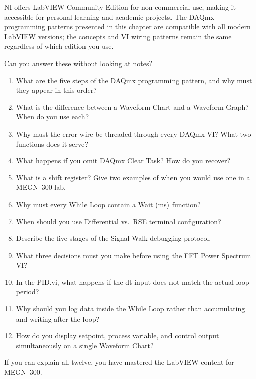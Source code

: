 \begin{tipbox}
NI offers LabVIEW Community Edition for non-commercial use, making it accessible for personal learning and academic projects. The DAQmx programming patterns presented in this chapter are compatible with all modern LabVIEW versions; the concepts and VI wiring patterns remain the same regardless of which edition you use.
\end{tipbox}

\begin{masterycheckbox}
Can you answer these without looking at notes?
\begin{enumerate}[leftmargin=1.5em]
\item What are the five steps of the DAQmx programming pattern, and why must they appear in this order?
\item What is the difference between a Waveform Chart and a Waveform Graph? When do you use each?
\item Why must the error wire be threaded through every DAQmx VI? What two functions does it serve?
\item What happens if you omit DAQmx Clear Task? How do you recover?
\item What is a shift register? Give two examples of when you would use one in a MEGN~300 lab.
\item Why must every While Loop contain a Wait (ms) function?
\item When should you use Differential vs.\ RSE terminal configuration?
\item Describe the five stages of the Signal Walk debugging protocol.
\item What three decisions must you make before using the FFT Power Spectrum VI?
\item In the PID.vi, what happens if the dt input does not match the actual loop period?
\item Why should you log data inside the While Loop rather than accumulating and writing after the loop?
\item How do you display setpoint, process variable, and control output simultaneously on a single Waveform Chart?
\end{enumerate}
If you can explain all twelve, you have mastered the LabVIEW content for MEGN~300.
\end{masterycheckbox}

